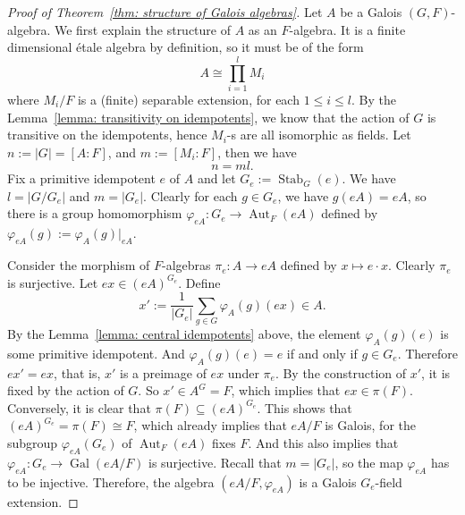 \documentclass[12pt,a4paper]{amsart}
\numberwithin{equation}{section}%
\theoremstyle{plain}%
\theoremstyle{definition}%
\theoremstyle{remark}%
\begin{document}
	\begin{proof}[Proof of Theorem~\ref{thm: structure of Galois algebras}]
		Let $A$ be a Galois $(G,F)$-algebra.
		We first explain the structure of $A$ as an $F$-algebra.
		It is a finite dimensional {\'e}tale algebra by definition, so it must be of the form
		\begin{equation*}
			A\cong\prod_{i=1}^l M_i
		\end{equation*}
		where $M_i/F$ is a (finite) separable extension, for each $1\leq i\leq l$.
		By the Lemma~\ref{lemma: transitivity on idempotents}, we know that the action of $G$ is transitive on the idempotents, hence $M_i$-s are all isomorphic as fields.
		Let $n:=\lvert G\rvert=[A:F]$, and $m:=[M_i:F]$, then we have
		\begin{equation*}
			n=ml.
		\end{equation*}
		Fix a primitive idempotent $e$ of $A$ and let $G_e:=\operatorname{Stab}_G(e)$.
		We have $l=\lvert G/G_e\rvert$ and $m=\lvert G_e\rvert$.		
		Clearly for each $g\in G_e$, we have $g(eA)=eA$, so there is a group homomorphism $\varphi_{eA}:G_e\to\operatorname{Aut}_F(eA)$ defined by $\varphi_{eA}(g):=\varphi_A(g)\vert_{eA}$.
		
		Consider the morphism of $F$-algebras $\pi_e:A\to eA$ defined by $x\mapsto e\cdot x$.
		Clearly $\pi_e$ is surjective.
		Let $ex\in(eA)^{G_e}$.
		Define
		\begin{equation*}
			x':=\frac{1}{\lvert G_e\rvert}\sum_{g\in G}\varphi_A(g)(ex)\in A.
		\end{equation*}
		By the Lemma~\ref{lemma: central idempotents} above, the element $\varphi_A(g)(e)$ is some primitive idempotent.
		And $\varphi_A(g)(e)=e$ if and only if $g\in G_e$.
		Therefore $ex'=ex$, that is, $x'$ is a preimage of $ex$ under $\pi_e$.
		By the construction of $x'$, it is fixed by the action of $G$.
		So $x'\in A^G=F$, which implies that $ex\in\pi(F)$.
		Conversely, it is clear that $\pi(F)\subseteq(eA)^{G_e}$.
		This shows that $(eA)^{G_e}=\pi(F)\cong F$, which already implies that $eA/F$ is Galois, for the subgroup $\varphi_{eA}(G_e)$ of $\operatorname{Aut}_F(eA)$ fixes $F$.
		And this also implies that $\varphi_{eA}:G_e\to\operatorname{Gal}(eA/F)$ is surjective.		
		Recall that $m=\lvert G_e\rvert$, so the map $\varphi_{eA}$ has to be injective.
		Therefore, the algebra $(eA/F,\varphi_{eA})$ is a Galois $G_e$-field extension.
		

\end{proof}
\end{document}
